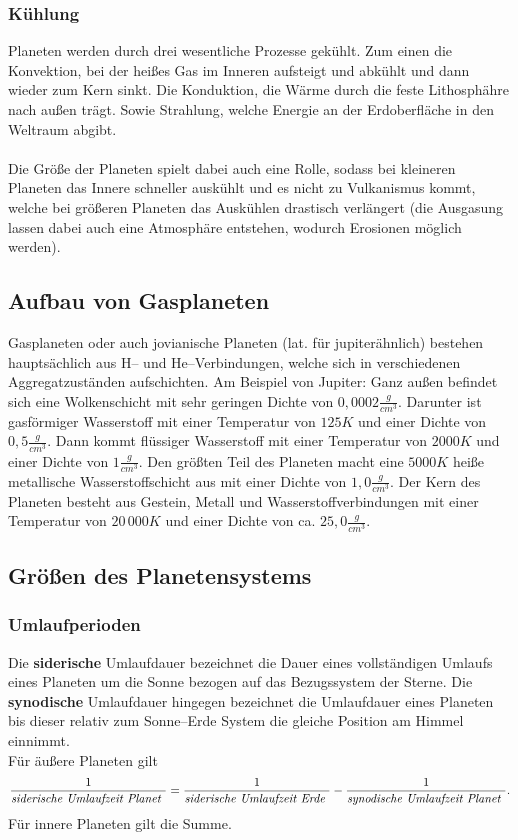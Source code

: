 \documentclass[a4paper,12pt]{article}
\begin{document}
\subsubsection{Kühlung}
Planeten werden durch drei wesentliche Prozesse gekühlt. Zum einen die Konvektion, bei der heißes Gas im Inneren aufsteigt und abkühlt und dann wieder zum Kern sinkt. Die Konduktion, die Wärme durch die feste Lithosphähre nach außen trägt. Sowie Strahlung, welche Energie an der Erdoberfläche in den Weltraum abgibt.\\\\Die Größe der Planeten spielt dabei auch eine Rolle, sodass bei kleineren Planeten das Innere schneller auskühlt und es nicht zu Vulkanismus kommt, welche bei größeren Planeten das Auskühlen drastisch verlängert (die Ausgasung lassen dabei auch eine Atmosphäre entstehen, wodurch Erosionen möglich werden).

\subsection{Aufbau von Gasplaneten}
Gasplaneten oder auch jovianische Planeten (lat. für jupiterähnlich) bestehen hauptsächlich aus H-- und He--Verbindungen, welche sich in verschiedenen Aggregatzuständen aufschichten. Am Beispiel von Jupiter: Ganz außen befindet sich eine Wolkenschicht mit sehr geringen Dichte von $0,0002 \tfrac{g}{cm^3}$. Darunter ist gasförmiger Wasserstoff mit einer Temperatur von $125K$ und einer Dichte von $0,5\tfrac{g}{cm^3}$. Dann kommt flüssiger Wasserstoff mit einer Temperatur von $2000K$ und einer Dichte von $1\tfrac{g}{cm^3}$. Den größten Teil des Planeten macht eine $5000K$ heiße metallische Wasserstoffschicht aus mit einer Dichte von $1,0\tfrac{g}{cm^3}$. Der Kern des Planeten besteht aus Gestein, Metall und Wasserstoffverbindungen mit einer Temperatur von $20\,000K$ und einer Dichte von ca. $25,0\tfrac{g}{cm^3}$.

\subsection{Größen des Planetensystems}
\subsubsection{Umlaufperioden}
Die \textbf{siderische} Umlaufdauer bezeichnet die Dauer eines vollständigen Umlaufs eines Planeten um die Sonne bezogen auf das Bezugssystem der Sterne. Die \textbf{synodische} Umlaufdauer hingegen bezeichnet die Umlaufdauer eines Planeten bis dieser relativ zum Sonne--Erde System die gleiche Position am Himmel einnimmt.\\Für äußere Planeten gilt
\[ 
        \dfrac{1}{\text{\textit{siderische Umlaufzeit Planet} }}=\dfrac{1}{\text{\textit{siderische Umlaufzeit Erde} }}-\dfrac{1}{\text{\textit{synodische Umlaufzeit Planet} }}
.\] 
Für innere Planeten gilt die Summe.
\end{document}
